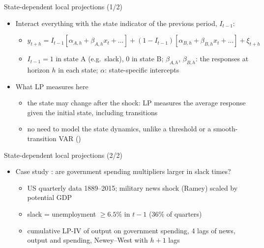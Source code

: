 \begin{frame}{State-dependent local projections (1/2)}
\itemsize{\small}
\begin{itemize}
    \item Interact everything with the state indicator of the previous period, $I_{t-1}$:
    \begin{itemize}
        \item $y_{t+h} = I_{t-1}[\alpha_{A,h} + \beta_{A,h}x_t + \dots] + (1 - I_{t-1})[\alpha_{B,h} + \beta_{B,h}x_t + \dots] + \xi_{t+h}$
        \item $I_{t-1} = 1$ in state A (e.g.\ slack), 0 in state B; $\beta_{A,h}$, $\beta_{B,h}$: the responses at horizon $h$ in each state; $\alpha$: state-specific intercepts
    \end{itemize}
    \item What LP measures here
    \begin{itemize}
        \item the state may change after the shock: LP measures the average response given the initial state, including transitions
        \item no need to model the state dynamics, unlike a threshold or a smooth-transition VAR ()
    \end{itemize}
\end{itemize}
\end{frame}

\begin{frame}{State-dependent local projections (2/2)}
\itemsize{\small}
\begin{itemize}
    \item Case study : are government spending multipliers larger in slack times?
    \begin{itemize}
        \item US quarterly data 1889--2015; military news shock (Ramey) scaled by potential GDP
        \item slack = unemployment $\ge 6.5\%$ in $t - 1$ (36\% of quarters)
        \item cumulative LP-IV of output on government spending, 4 lags of news, output and spending, Newey--West with $h + 1$ lags
    \end{itemize}
\end{itemize}
\end{frame}

